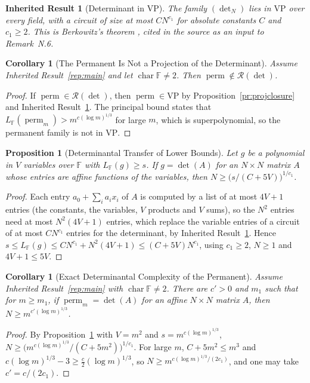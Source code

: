 \documentclass[11pt,letterpaper]{report}
\theoremstyle{plain}
\newtheorem{proposition}[theorem]{Proposition}
\newtheorem{corollary}[theorem]{Corollary}
\newtheorem{inherited}[theorem]{Inherited Result}
\theoremstyle{definition}
\theoremstyle{remark}
\DeclareMathOperator{\perm}{perm}
\newcommand{\VP}{\mathrm{VP}}
\begin{document}
\begin{inherited}[Determinant in VP]\label{inh:detvp}
The family $(\det_N)$ lies in $\VP$ over every field, with a circuit of size at most $CN^{c_1}$ for absolute constants $C$ and $c_1\ge2$. This is Berkowitz's theorem \cite{Berkowitz1984}, cited in the source as an input to Remark~N.6.
\end{inherited}

\begin{corollary}[The Permanent Is Not a Projection of the Determinant]\label{co:permnotproj}
Assume Inherited Result~\ref{rep:main} and let $\operatorname{char}\mathbb F\ne2$. Then $\perm\notin\mathcal R(\det)$.
\end{corollary}
\begin{proof}
If $\perm\in\mathcal R(\det)$, then $\perm\in\VP$ by Proposition~\ref{pr:projclosure} and Inherited Result~\ref{inh:detvp}. The principal bound states that $L_{\mathbb F}(\perm_m)>m^{c(\log m)^{1/3}}$ for large $m$, which is superpolynomial, so the permanent family is not in $\VP$.
\end{proof}

\begin{proposition}[Determinantal Transfer of Lower Bounds]\label{pr:dettransfer}
Let $g$ be a polynomial in $V$ variables over $\mathbb F$ with $L_{\mathbb F}(g)\ge s$. If $g=\det(A)$ for an $N\times N$ matrix $A$ whose entries are affine functions of the variables, then $N\ge\bigl(s/(C+5V)\bigr)^{1/c_1}$.
\end{proposition}
\begin{proof}
Each entry $a_0+\sum_ia_ix_i$ of $A$ is computed by a list of at most $4V+1$ entries (the constants, the variables, $V$ products and $V$ sums), so the $N^2$ entries need at most $N^2(4V+1)$ entries, which replace the variable entries of a circuit of at most $CN^{c_1}$ entries for the determinant, by Inherited Result~\ref{inh:detvp}. Hence $s\le L_{\mathbb F}(g)\le CN^{c_1}+N^2(4V+1)\le(C+5V)N^{c_1}$, using $c_1\ge2$, $N\ge1$ and $4V+1\le5V$.
\end{proof}

\begin{corollary}[Exact Determinantal Complexity of the Permanent]\label{co:detcomplexity}
Assume Inherited Result~\ref{rep:main} with $\operatorname{char}\mathbb F\ne2$. There are $c'>0$ and $m_1$ such that for $m\ge m_1$, if $\perm_m=\det(A)$ for an affine $N\times N$ matrix $A$, then $N\ge m^{c'(\log m)^{1/3}}$.
\end{corollary}
\begin{proof}
By Proposition~\ref{pr:dettransfer} with $V=m^2$ and $s=m^{c(\log m)^{1/3}}$, $N\ge\bigl(m^{c(\log m)^{1/3}}/(C+5m^2)\bigr)^{1/c_1}$. For large $m$, $C+5m^2\le m^{3}$ and $c(\log m)^{1/3}-3\ge\tfrac c2(\log m)^{1/3}$, so $N\ge m^{c(\log m)^{1/3}/(2c_1)}$, and one may take $c'=c/(2c_1)$.
\end{proof}
\end{document}

